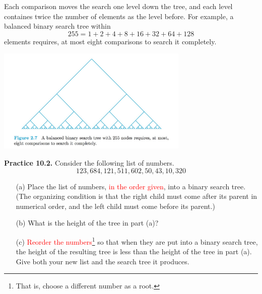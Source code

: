 \documentclass[aspectratio=169]{beamer}
\providecommand{\Red}[1]{\textcolor{red}{#1}}
\begin{document}
\begin{frame}[plain]{}

    {\small Each comparison moves the search one level down the tree, and
    each level containes twice the number of elements as the level before.
    For example, a balanced binary search tree within
    \[ 255 = 1+2+4+8+16+32+64+128 \]
    elements requires, at most eight comparisons to search it completely. }

    \begin{center}
        \includegraphics[height=5cm]{./img/lecture10-fig2.png}
      \end{center} 
  
\end{frame}


\begin{frame}[plain]{}

 {\bf Practice 10.2.}  Consider the following list of numbers.
     \[  123, 684, 121, 511, 602, 50, 43, 10, 320 \]
          
     \begin{itemize}
      \item[(a)] Place the list of numbers, \Red{in the order given},  
         into a binary search tree. (The organizing 
         condition is that the right child must come after its parent in
          numerical  order, and the left child must come before its parent.)
      \item[(b)] %
        What is the height of the tree in part (a)? 
     \item[(c)] \Red{Reorder the numbers}\footnote{That is, choose a different number as a root.}
      so that when they are put into a binary search tree, 
        the height of the resulting tree is less 
     than the height of the tree in part (a). Give both your new list and the search tree it 
           produces.
    \end{itemize}
    
    \vspace{0.7in}
    
 \end{frame}
 
\end{document}
